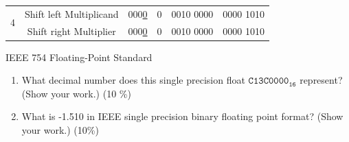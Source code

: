 \documentclass[12pt, a4paper]{article}
\begin{document}
\begin{ans}
\begin{center}
\begin{tabular}{|c|c|c|c|c|c|}
            \multirow{2}{*}{4}
                                & \multicolumn{1}{|c}{Shift left Multiplicand} & \multicolumn{1}{|c}{000\underline{0}} & \multicolumn{1}{|c}{0} & \multicolumn{1}{|c}{0010 0000} & \multicolumn{1}{|c|}{0000 1010} \\\cline{2-6}
                                & \multicolumn{1}{|c}{Shift right Multiplier} & \multicolumn{1}{|c}{000\underline{0}} & \multicolumn{1}{|c}{0} & \multicolumn{1}{|c}{0010 0000} & \multicolumn{1}{|c|}{0000 1010} \\\hline
        \end{tabular}
    \end{center}
\end{ans}
\pagebreak

\begin{q}{20}
    IEEE 754 Floating-Point Standard
    \begin{enumerate}
        \item What decimal number does this single precision float $\mathtt{C13C0000_{16}}$ represent? (Show your work.) (10 \%)
        \item What is -1.510 in IEEE single precision binary floating point format? (Show your work.) (10\%)
    \end{enumerate}
\end{q}
\end{document}
